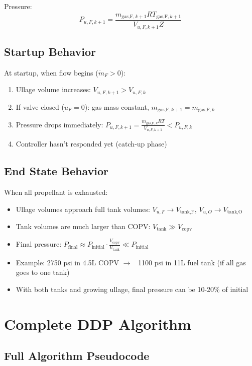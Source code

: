 \documentclass[11pt,a4paper]{article}
\begin{document}
Pressure:
\begin{equation}
P_{u,F,k+1} = \frac{m_{\text{gas,F},k+1} R T_{\text{gas,F},k+1}}{V_{u,F,k+1} Z}
\end{equation}

\subsection{Startup Behavior}

At startup, when flow begins ($\dot{m}_F > 0$):
\begin{enumerate}
    \item Ullage volume increases: $V_{u,F,k+1} > V_{u,F,k}$
    \item If valve closed ($u_F = 0$): gas mass constant, $m_{\text{gas,F},k+1} = m_{\text{gas,F},k}$
    \item Pressure drops immediately: $P_{u,F,k+1} = \frac{m_{\text{gas,F},k} R T}{V_{u,F,k+1}} < P_{u,F,k}$
    \item Controller hasn't responded yet (catch-up phase)
\end{enumerate}

\subsection{End State Behavior}

When all propellant is exhausted:
\begin{itemize}
    \item Ullage volumes approach full tank volumes: $V_{u,F} \to V_{\text{tank,F}}$, $V_{u,O} \to V_{\text{tank,O}}$
    \item Tank volumes are much larger than COPV: $V_{\text{tank}} \gg V_{\text{copv}}$
    \item Final pressure: $P_{\text{final}} \approx P_{\text{initial}} \cdot \frac{V_{\text{copv}}}{V_{\text{tank}}} \ll P_{\text{initial}}$
    \item Example: 2750 psi in 4.5L COPV $\to$ ~1100 psi in 11L fuel tank (if all gas goes to one tank)
    \item With both tanks and growing ullage, final pressure can be 10-20\% of initial
\end{itemize}

\section{Complete DDP Algorithm}

\subsection{Full Algorithm Pseudocode}
\end{document}
